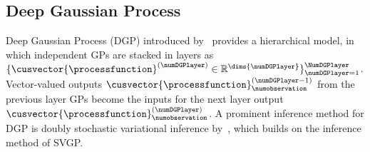\subsection{Deep Gaussian Process}\label{sec:DGP}
Deep Gaussian Process (DGP) introduced by~\cite{damianou2013deep} provides a hierarchical model, in which independent GPs are stacked in layers as $\{\cusvector{\processfunction}^{(\numDGPlayer)}\in\mathbb{R}^{\dims{\numDGPlayer}}\}^{\NumDGPlayer}_{\numDGPlayer=1}$. Vector-valued outputs $\cusvector{\processfunction}_{\numobservation}^{(\numDGPlayer-1)}$ from the previous layer GPs become the inputs for the next layer output $\cusvector{\processfunction}_{\numobservation}^{(\numDGPlayer)}$.
A prominent inference method for DGP is doubly stochastic variational inference by~\cite{salimbeni2017doubly}, which builds on the inference method of SVGP.

